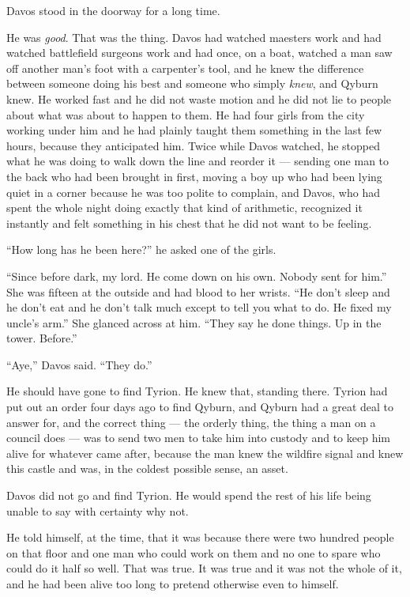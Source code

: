 Davos stood in the doorway for a long time.

He was \textit{good}. That was the thing. Davos had watched maesters work and had watched battlefield surgeons work and had once, on a boat, watched a man saw off another man’s foot with a carpenter’s tool, and he knew the difference between someone doing his best and someone who simply \textit{knew}, and Qyburn knew. He worked fast and he did not waste motion and he did not lie to people about what was about to happen to them. He had four girls from the city working under him and he had plainly taught them something in the last few hours, because they anticipated him. Twice while Davos watched, he stopped what he was doing to walk down the line and reorder it — sending one man to the back who had been brought in first, moving a boy up who had been lying quiet in a corner because he was too polite to complain, and Davos, who had spent the whole night doing exactly that kind of arithmetic, recognized it instantly and felt something in his chest that he did not want to be feeling.

“How long has he been here?” he asked one of the girls.

“Since before dark, my lord. He come down on his own. Nobody sent for him.” She was fifteen at the outside and had blood to her wrists. “He don’t sleep and he don’t eat and he don’t talk much except to tell you what to do. He fixed my uncle’s arm.” She glanced across at him. “They say he done things. Up in the tower. Before.”

“Aye,” Davos said. “They do.”

He should have gone to find Tyrion. He knew that, standing there. Tyrion had put out an order four days ago to find Qyburn, and Qyburn had a great deal to answer for, and the correct thing — the orderly thing, the thing a man on a council does — was to send two men to take him into custody and to keep him alive for whatever came after, because the man knew the wildfire signal and knew this castle and was, in the coldest possible sense, an asset.

Davos did not go and find Tyrion. He would spend the rest of his life being unable to say with certainty why not.

He told himself, at the time, that it was because there were two hundred people on that floor and one man who could work on them and no one to spare who could do it half so well. That was true. It was true and it was not the whole of it, and he had been alive too long to pretend otherwise even to himself.


